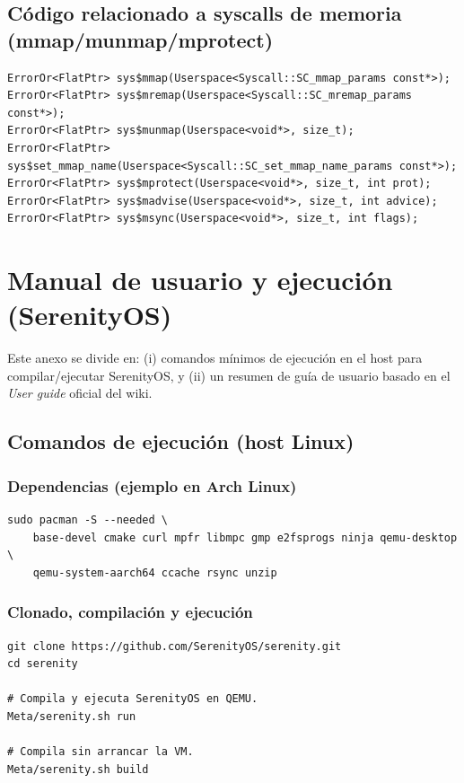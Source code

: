 \section{Código relacionado a syscalls de memoria (mmap/munmap/mprotect)}
{\small
\begin{verbatim}
ErrorOr<FlatPtr> sys$mmap(Userspace<Syscall::SC_mmap_params const*>);
ErrorOr<FlatPtr> sys$mremap(Userspace<Syscall::SC_mremap_params const*>);
ErrorOr<FlatPtr> sys$munmap(Userspace<void*>, size_t);
ErrorOr<FlatPtr> sys$set_mmap_name(Userspace<Syscall::SC_set_mmap_name_params const*>);
ErrorOr<FlatPtr> sys$mprotect(Userspace<void*>, size_t, int prot);
ErrorOr<FlatPtr> sys$madvise(Userspace<void*>, size_t, int advice);
ErrorOr<FlatPtr> sys$msync(Userspace<void*>, size_t, int flags);
\end{verbatim}
}

\newpage
\chapter{Manual de usuario y ejecución (SerenityOS)}\label{anexo:manual}

Este anexo se divide en: (i) comandos mínimos de ejecución en el host para compilar/ejecutar SerenityOS, y (ii) un resumen de guía de usuario basado en el \emph{User guide} oficial del wiki.

\section{Comandos de ejecución (host Linux)}
\subsection{Dependencias (ejemplo en Arch Linux)}
{\small
\begin{verbatim}
sudo pacman -S --needed \
	base-devel cmake curl mpfr libmpc gmp e2fsprogs ninja qemu-desktop \
	qemu-system-aarch64 ccache rsync unzip
\end{verbatim}
}

\subsection{Clonado, compilación y ejecución}
{\small
\begin{verbatim}
git clone https://github.com/SerenityOS/serenity.git
cd serenity

# Compila y ejecuta SerenityOS en QEMU.
Meta/serenity.sh run

# Compila sin arrancar la VM.
Meta/serenity.sh build
\end{verbatim}
}

